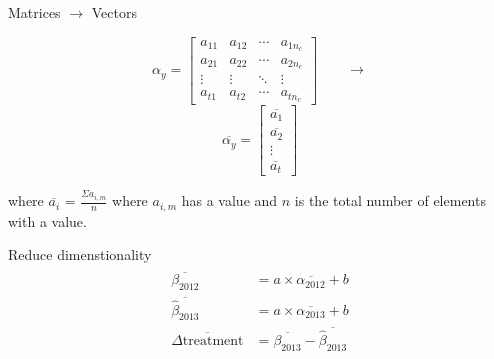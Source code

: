 \documentclass{beamer}
\begin{document}

\begin{frame}{Matrices $\rightarrow$ Vectors}
  \begin{multicols}{2}
    $$
    \alpha_y = \left[\begin{array}{cccc}
    a_{11} & a_{12} & \cdots & a_{1 n_c} \\
    a_{21} & a_{22} & \cdots & a_{2 n_c} \\
    \vdots & \vdots & \ddots & \vdots \\
    a_{t 1} & a_{t 2} & \cdots & a_{t n_c}
    \end{array}\right]
    \qquad\longrightarrow
    $$
    \break
    $$
    \overline{\alpha_y} = \left[\begin{array}{cccc}
    \overline{a_{1}} \\
    \overline{a_{2}} \\
    \vdots \\
    \overline{a_{t}}
    \end{array}\right]
    $$
  \end{multicols}
  where $\overline{a_{i}}$ = $\frac{\Sigma{a_{i, m}}}{n}$ where $a_{i, m}$ has a value and $n$ is the total number of elements with a value.
\end{frame}

\begin{frame}{Reduce dimenstionality}
  \begin{align*}
    \begin{split}
      \overline{\beta_{2012}} &= a \times \overline{\alpha_{2012}} + b \\
      \overline{\hat{\beta}_{2013}} &= a \times \overline{\alpha_{2013}} + b \\
      \overline{\Delta\mbox{treatment}} &= \overline{\beta_{2013}} - \overline{\hat{\beta}_{2013}}
    \end{split}
  \end{align*}
\end{frame}
\end{document}
